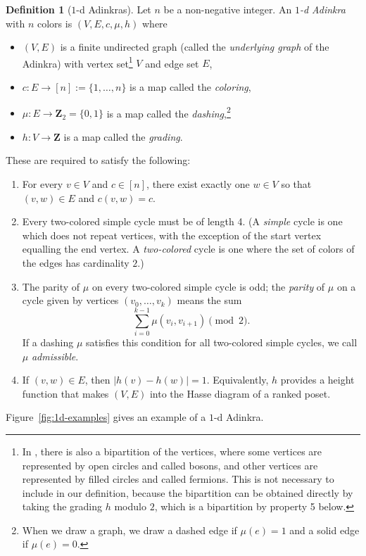 \documentclass[12pt,twoside,singlespace]{article}
\numberwithin{equation}{section}
\theoremstyle{definition}
\newtheorem{definition}[equation]{Definition}
\newcommand{\ZZ}{\mathbf{Z}}
\begin{document}
\begin{definition}[$1$-d Adinkras]
Let $n$ be a non-negative integer.  An \emph{$1$-d Adinkra} with $n$ colors is $(V,E,c,\mu,h)$ where
\begin{itemize}
\item $(V,E)$ is a finite undirected graph (called the \emph{underlying graph} of the Adinkra) with vertex set\footnote{In \cite{d2l:first,d2l:graph-theoretic}, there is also a bipartition of the vertices, where some vertices are represented by open circles and called bosons, and other vertices are represented by filled circles and called fermions.  This is not necessary to include in our definition, because the bipartition can be obtained directly by taking the grading $h$ modulo $2$, which is a bipartition by property 5 below.}
 $V$ and edge set $E$,
\item $c:E\to [n] := \{1,\ldots,n\}$ is a map called the \emph{coloring},
\item $\mu:E\to \ZZ_2=\{0,1\}$ is a map called the \emph{dashing},\footnote{When we draw a graph, we draw a dashed edge if $\mu(e)=1$ and a solid edge if $\mu(e)=0$.}
\item $h:V\to\ZZ$ is a map called the \emph{grading}.
\end{itemize}

These are required to satisfy the following:
\begin{enumerate}
\item For every $v\in V$ and $c\in [n]$, there exist exactly one $w\in V$ so that $(v,w)\in E$ and $c(v,w)=c$. 
\item Every two-colored simple cycle must be of length 4.  (A \emph{simple} cycle is one which does not repeat vertices, with the exception of the start vertex equalling the end vertex.  A \emph{two-colored} cycle is one where the set of colors of the edges has cardinality $2$.)
\item The parity of $\mu$ on every two-colored simple cycle is odd; the \emph{parity} of $\mu$ on a cycle given by vertices $(v_0,\ldots,v_k)$ means the sum
\[\sum_{i=0}^{k-1}\mu(v_i,v_{i+1})\pmod{2}.\]
If a dashing $\mu$ satisfies this condition for all two-colored simple cycles, we call $\mu$ \emph{admissible}.
\item If $(v,w)\in E$, then $|h(v)-h(w)|=1$. Equivalently, $h$ provides a height function that makes $(V,E)$ into the Hasse diagram of a ranked poset.
\end{enumerate}

Figure~\ref{fig:1d-examples} gives an example of a $1$-d Adinkra.
\end{definition}
\end{document}

